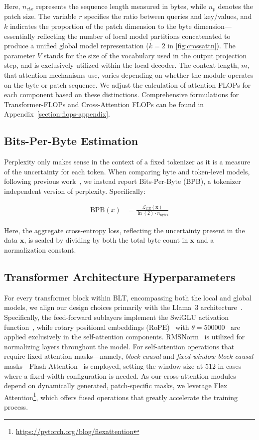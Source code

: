 Here, $n_{ctx}$ represents the sequence length measured in bytes, while $n_p$ denotes the patch size. The variable $r$ specifies the ratio between queries and key/values, and $k$ indicates the proportion of the patch dimension to the byte dimension—essentially reflecting the number of local model partitions concatenated to produce a unified global model representation ($k=2$ in \autoref{fig:crossattn}). The parameter $V$ stands for the size of the vocabulary used in the output projection step, and is exclusively utilized within the local decoder. The context length, $m$, that attention mechanisms use, varies depending on whether the module operates on the byte or patch sequence. We adjust the calculation of attention FLOPs for each component based on these distinctions. Comprehensive formulations for Transformer-FLOPs and Cross-Attention FLOPs can be found in Appendix~\ref{section:flops-appendix}.

\subsection{Bits-Per-Byte Estimation} Perplexity only makes sense in the context of a fixed tokenizer as it is a measure of the uncertainty for each token. When comparing byte and token-level models, following previous work~\citep{xue2022byt5, yu2023megabyte, wang2024mambabyte}, we instead report Bits-Per-Byte (BPB), a tokenizer independent version of perplexity. Specifically:

\begin{align}
    \text{BPB}(x)&= \frac{\mathcal{L}_{CE}(\pmb{x})}{\ln(2)\cdot n_{\text{bytes}}}
\end{align}

Here, the aggregate cross-entropy loss, reflecting the uncertainty present in the data $\pmb{x}$, is scaled by dividing by both the total byte count in $\pmb{x}$ and a normalization constant.

\subsection{Transformer Architecture Hyperparameters} 

For every transformer block within {\textsc BLT}, encompassing both the local and global models, we align our design choices primarily with the Llama~3 architecture~\citep{dubey2024llama}. Specifically, the feed-forward sublayers implement the SwiGLU activation function~\citep{swiglu}, while rotary positional embeddings (RoPE)~\citep{RoPe} with $\theta=500000$~\citep{xiong2024effective} are applied exclusively in the self-attention components. RMSNorm~\citep{RMSNorm} is utilized for normalizing layers throughout the model. For self-attention operations that require fixed attention masks—namely, \textit{block causal} and \textit{fixed-window block causal} masks—Flash Attention~\citep{dao2022flashattention} is employed, setting the window size at 512 in cases where a fixed-width configuration is needed. As our cross-attention modules depend on dynamically generated, patch-specific masks, we leverage Flex Attention\footnote{\url{https://pytorch.org/blog/flexattention}}, which offers fused operations that greatly accelerate the training process.

